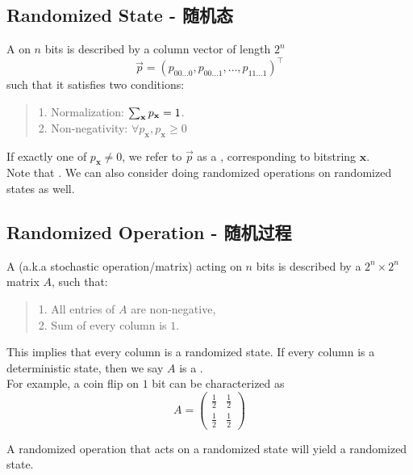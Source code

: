 \subsection{Randomized State - 随机态}
\begin{definition}
    A  on $n$ bits is described by a column vector of length $2^n$
    $$\vec{p} = (p_{00 \dots 0}, p_{00 \dots 1}, \dots, p_{11 \dots 1})^\top$$
    such that it satisfies two conditions:
    \begin{quote}
        1. Normalization: $\sum_{\mathbf{x}} p_{\mathbf{x}} = 1$. \\
        2. Non-negativity: $\forall p_{\mathbf{x}}, p_{\mathbf{x}} \ge 0$
    \end{quote}
\end{definition}
If exactly one of $p_{\mathbf{x}} \ne 0$, we refer to $\vec{p}$ as a , corresponding to bitstring $\mathbf{x}$. \\
Note that . We can also consider doing randomized operations on randomized states as well.

\subsection{Randomized Operation - 随机过程}
\begin{definition}
    A  (a.k.a stochastic operation/matrix) acting on $n$ bits is described by a $2^n \times 2^n$ matrix $A$, such that:
    \begin{quote}
        1. All entries of $A$ are non-negative, \\
        2. Sum of every column is $1$.
    \end{quote}
\end{definition}
This implies that every column is a randomized state. If every column is a deterministic state, then we say $A$ is a . \\
For example, a coin flip on $1$ bit can be characterized as
$$A = \begin{pmatrix}
    \frac{1}{2} & \frac{1}{2} \\
    \frac{1}{2} & \frac{1}{2}
\end{pmatrix}$$
\begin{lemma}
    A randomized operation that acts on a randomized state will yield a randomized state.
\end{lemma}

